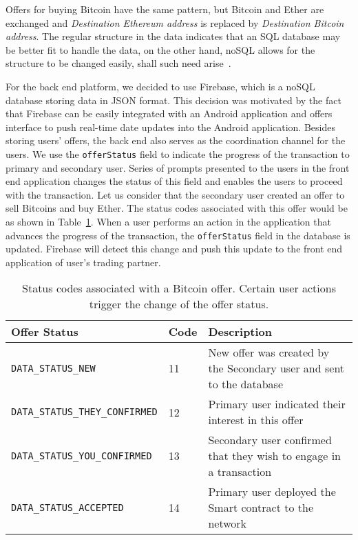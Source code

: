 Offers for buying Bitcoin have the same pattern, but Bitcoin and Ether are exchanged and \textit{Destination Ethereum address} is replaced by \textit{Destination Bitcoin address}. The regular structure in the data indicates that an SQL database may be better fit to handle the data, on the other hand, noSQL allows for the structure to be changed easily, shall such need arise~\cite{Xplenty2017TheMedium}.

For the back end platform, we decided to use Firebase, which is a noSQL database storing data in JSON format. This decision was motivated by the fact that Firebase can be easily integrated with an Android application and offers interface to push real-time date updates into the Android application. Besides storing users' offers, the back end also serves as the coordination channel for the users. We use the \texttt{offerStatus} field to indicate the progress of the transaction to primary and secondary user. Series of prompts presented to the users in the front end application changes the status of this field and enables the users to proceed with the transaction. Let us consider that the secondary user created an offer to sell Bitcoins and buy Ether. The status codes associated with this offer would be as shown in Table~\ref{tab:offer-status}. When a user performs an action in the application that advances the progress of the transaction, the \texttt{offerStatus} field in the database is updated. Firebase will detect this change and push this update to the front end application of user's trading partner.

\begin{table}[ht]
    \centering
    \begin{tabularx}{\textwidth}{|l|l|X|}
        \hline
        \textbf{Offer Status}&\textbf{Code}&\textbf{Description}\\
        \hline
        \hline
        \texttt{DATA\_STATUS\_NEW}&11&New offer was created by the Secondary user and sent to the database\\
        \hline
        \texttt{DATA\_STATUS\_THEY\_CONFIRMED}&12&Primary user indicated their interest in this offer\\
        \hline
        \texttt{DATA\_STATUS\_YOU\_CONFIRMED}&13&Secondary user confirmed that they wish to engage in a transaction\\
        \hline
        \texttt{DATA\_STATUS\_ACCEPTED }&14&Primary user deployed the Smart contract to the network\\
        \hline
    \end{tabularx}
    \caption{Status codes associated with a Bitcoin offer. Certain user actions trigger the change of the offer status.}
    \label{tab:offer-status}
\end{table}